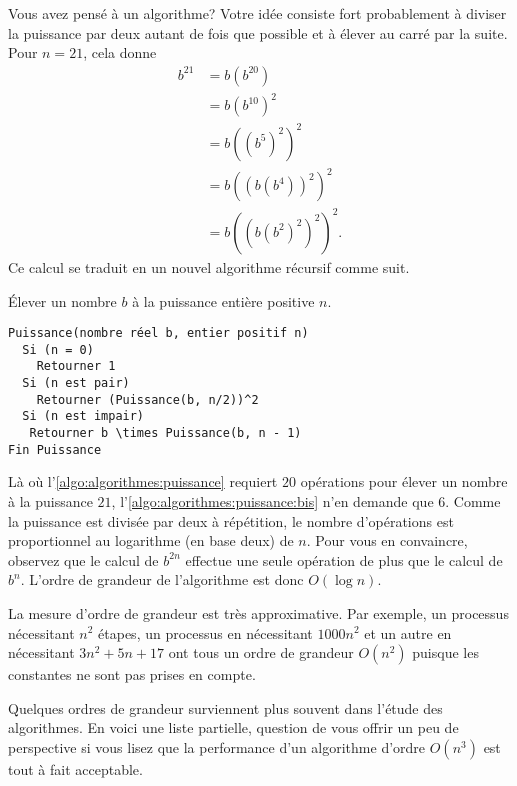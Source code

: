 Vous avez pensé à un algorithme? Votre idée consiste fort probablement
à diviser la puissance par deux autant de fois que possible et à
élever au carré par la suite. Pour $n = 21$, cela donne
\begin{align*}
  b^{21}
  &= b (b^{20}) \\
  & = b (b^{10})^2 \\
  &= b ((b^5)^2)^2 \\
  & = b ((b (b^4))^2)^2 \\
  &= b ((b (b^2)^2)^2)^2.
\end{align*}
Ce calcul se traduit en un nouvel algorithme récursif comme suit.

\begin{algorithmebis}
  \label{algo:algorithmes:puissance:bis}
  Élever un nombre $b$ à la puissance entière positive $n$.
  \begin{Schunk}
\begin{Verbatim}[commandchars=\\\{\}]
Puissance(nombre réel b, entier positif n)
  Si (n = 0)
    Retourner 1
  Si (n est pair)
    Retourner (Puissance(b, n/2))^2
  Si (n est impair)
   Retourner b \times Puissance(b, n - 1)
Fin Puissance
\end{Verbatim}
  \end{Schunk}
\end{algorithmebis}

Là où l'\autoref{algo:algorithmes:puissance} requiert $20$ opérations
pour élever un nombre à la puissance $21$,
l'\autoref{algo:algorithmes:puissance:bis} n'en demande que $6$. Comme
la puissance est divisée par deux à répétition, le nombre d'opérations
est proportionnel au logarithme (en base deux) de $n$. Pour vous en
convaincre, observez que le calcul de $b^{2n}$ effectue une seule
opération de plus que le calcul de $b^n$. L'ordre de grandeur de
l'algorithme est donc $O(\log n)$.

La mesure d'ordre de grandeur est très approximative. Par exemple, un
processus nécessitant $n^2$ étapes, un processus en nécessitant
$1000n^2$ et un autre en nécessitant $3n^2 + 5n + 17$ ont tous un
ordre de grandeur $O(n^2)$ puisque les constantes ne sont pas prises
en compte.

Quelques ordres de grandeur surviennent plus souvent dans l'étude des
algorithmes. En voici une liste partielle, question de vous offrir un
peu de perspective si vous lisez que la performance d'un algorithme
d'ordre $O(n^3)$ est tout à fait acceptable.

